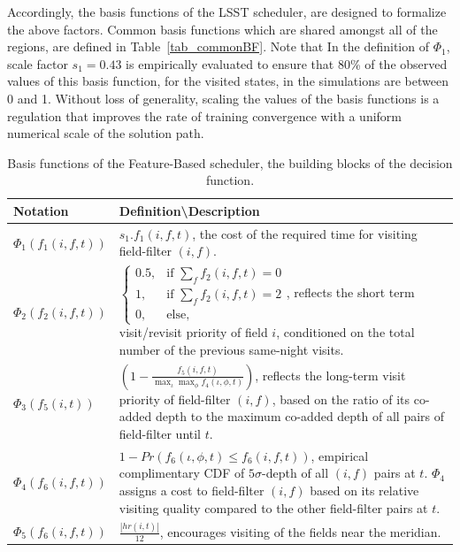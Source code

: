 \documentclass[12pt]{aastex62}
\theoremstyle{definition}
\begin{document}
Accordingly, the basis functions of the LSST scheduler, are designed to formalize the above factors. Common basis functions which are shared amongst all of the regions, are defined in Table~\ref{tab_commonBF}. Note that In the definition of $\Phi_1$, scale factor $s_1= 0.43$ is empirically evaluated to ensure that 80\% of the observed values of this basis function, for the visited states, in the simulations are between 0 and 1. Without loss of generality, scaling the values of the basis functions is a regulation that improves the rate of training convergence with a uniform numerical scale of the solution path.

\begin{table}[h]
\caption{Basis functions of the Feature-Based scheduler, the building blocks of the decision function.}
\begin{tabularx}{\textwidth}{| l | X |}
\hline
Notation & Definition\textbackslash Description\\ \hline \hline
$\Phi_1(f_1(i,f,t))$ & $s_1.f_1(i,f,t)$, the cost of the required time for visiting field-filter $(i,f)$.\\ \hline
$\Phi_2(f_2(i,f,t))$ &$\begin{cases}0.5,& \text{if } \sum\limits_{f}{f_2(i,f,t)} = 0\\ 1,& \text{if } \sum\limits_{f}{f_2(i,f,t)} = 2\\ 0,  & \text{else,}\end{cases}$, \newline reflects the short term visit/revisit priority of field $i$, conditioned on the total number of the previous same-night visits.\\ \hline
$\Phi_3(f_5(i,t))$ &  $(1 - \frac{f_5(i,f,t)}{\max_\iota \max_\phi f_4(\iota,\phi,t)})$, reflects the long-term visit priority of field-filter $(i,f)$, based on the ratio of its co-added depth to the maximum co-added depth of all pairs of field-filter until $t$.\\ \hline
$\Phi_4(f_6(i,f,t))$ & $1 - Pr(f_6(\iota,\phi,t) \leq f_6(i,f,t))$, empirical complimentary CDF of $5\sigma$-depth of all $(i,f)$ pairs at $t$. $\Phi_4$ assigns a cost to field-filter $(i,f)$ based on its relative visiting quality compared to the other field-filter pairs at $t$.\\ \hline
$\Phi_5(f_6(i,f,t))$ &  $\frac{|hr(i,t)|}{12}$, encourages visiting of the fields near the meridian.\\ \hline
\end{tabularx}
\end{table}\label{tab_commonBF}
\end{document}
